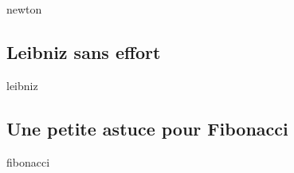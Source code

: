 \documentclass[12pt]{amsart}
\begin{document}
{newton}


\subsection{Leibniz sans effort}

{leibniz}


\subsection{Une petite astuce pour Fibonacci}

{fibonacci}


%
%
%
%
%
%
%
%
%
%
%
%
%
\end{document}
